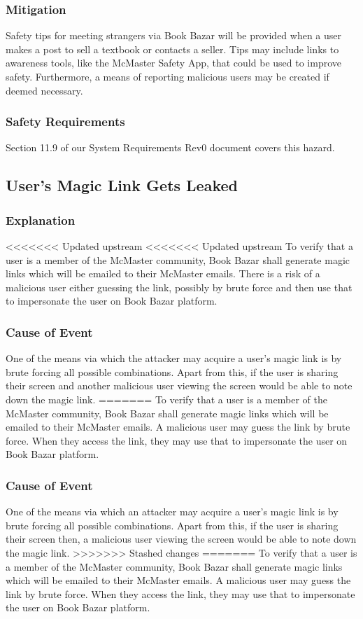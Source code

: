 \documentclass[fullpage]{article}
\begin{document}
\subsubsection*{Mitigation}
Safety tips for meeting strangers via Book Bazar will be provided when a user makes a post to sell a textbook or contacts a seller. Tips may include links to awareness tools, like the McMaster Safety App, that could be used to improve safety. Furthermore, a means of reporting malicious users may be created if deemed necessary.

\subsubsection*{Safety Requirements}
Section 11.9 of our System Requirements Rev0 document covers this hazard.

\subsection{User's Magic Link Gets Leaked}


\subsubsection*{Explanation}
<<<<<<< Updated upstream
<<<<<<< Updated upstream
To verify that a user is a member of the McMaster community, Book Bazar shall generate magic links which will be emailed to their McMaster emails. There is a risk of a malicious user either guessing the link, possibly by brute force and then use that to impersonate the user on Book Bazar platform. 
\subsubsection*{Cause of Event}
One of the means via which the attacker may acquire a user's magic link is by brute forcing all possible combinations. Apart from this, if the user is sharing their screen and another malicious user viewing the screen would be able to note down the magic link.
=======
To verify that a user is a member of the McMaster community, Book Bazar shall generate magic links which will be emailed to their McMaster emails. A malicious user may guess the link by brute force. When they access the link, they may use that to impersonate the user on Book Bazar platform. 
\subsubsection*{Cause of Event}
One of the means via which an attacker may acquire a user's magic link is by brute forcing all possible combinations. Apart from this, if the user is sharing their screen then, a malicious user viewing the screen would be able to note down the magic link.
>>>>>>> Stashed changes
=======
To verify that a user is a member of the McMaster community, Book Bazar shall generate magic links which will be emailed to their McMaster emails. A malicious user may guess the link by brute force. When they access the link, they may use that to impersonate the user on Book Bazar platform. 
\end{document}
